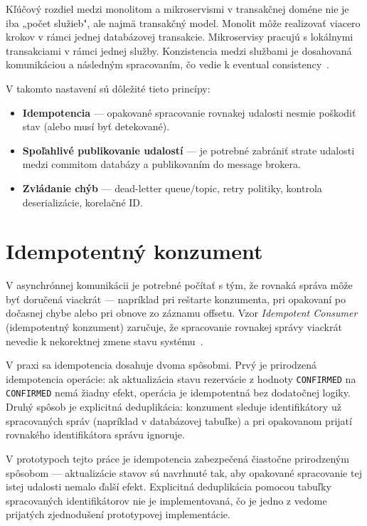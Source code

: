 Kľúčový rozdiel medzi monolitom a mikroservismi v transakčnej doméne nie je iba „počet služieb", ale najmä transakčný model. Monolit môže realizovať viacero krokov v rámci jednej databázovej transakcie. Mikroservisy pracujú s lokálnymi transakciami v rámci jednej služby. Konzistencia medzi službami je dosahovaná komunikáciou a následným spracovaním, čo vedie k eventual consistency~\cite{Vogels2009,Kleppmann2017}.

V takomto nastavení sú dôležité tieto princípy:
\begin{itemize}
    \item \textbf{Idempotencia} — opakované spracovanie rovnakej udalosti nesmie poškodiť stav (alebo musí byť detekované).
    \item \textbf{Spoľahlivé publikovanie udalostí} — je potrebné zabrániť strate udalosti medzi commitom databázy a publikovaním do message brokera.
    \item \textbf{Zvládanie chýb} — dead-letter queue/topic, retry politiky, kontrola deserializácie, korelačné ID.
\end{itemize}

\section{Idempotentný konzument}

V asynchrónnej komunikácii je potrebné počítať s tým, že rovnaká správa môže byť doručená viackrát — napríklad pri reštarte konzumenta, pri opakovaní po dočasnej chybe alebo pri obnove zo záznamu offsetu. Vzor \emph{Idempotent Consumer} (idempotentný konzument) zaručuje, že spracovanie rovnakej správy viackrát nevedie k nekorektnej zmene stavu systému~\cite{Richardson2018}.

V praxi sa idempotencia dosahuje dvoma spôsobmi. Prvý je prirodzená idempotencia operácie: ak aktualizácia stavu rezervácie z hodnoty \texttt{CONFIRMED} na \texttt{CONFIRMED} nemá žiadny efekt, operácia je idempotentná bez dodatočnej logiky. Druhý spôsob je explicitná deduplikácia: konzument sleduje identifikátory už spracovaných správ (napríklad v databázovej tabuľke) a pri opakovanom prijatí rovnakého identifikátora správu ignoruje.

V prototypoch tejto práce je idempotencia zabezpečená čiastočne prirodzeným spôsobom — aktualizácie stavov sú navrhnuté tak, aby opakované spracovanie tej istej udalosti nemalo ďalší efekt. Explicitná deduplikácia pomocou tabuľky spracovaných identifikátorov nie je implementovaná, čo je jedno z vedome prijatých zjednodušení prototypovej implementácie.

